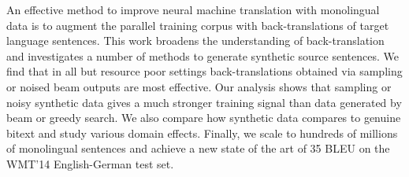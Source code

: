 An effective method to improve neural machine translation with monolingual data is to augment the parallel training corpus with back-translations of target language sentences. This work broadens the understanding of back-translation and investigates a number of methods to generate synthetic source sentences. We find that in all but resource poor settings back-translations obtained via sampling or noised beam outputs are most effective. Our analysis shows that sampling or noisy synthetic data gives a much stronger training signal than data generated by beam or greedy search. We also compare how synthetic data compares to genuine bitext and study various domain effects. Finally, we scale to hundreds of millions of monolingual sentences and achieve a new state of the art of 35 BLEU on the WMT'14 English-German test set.
